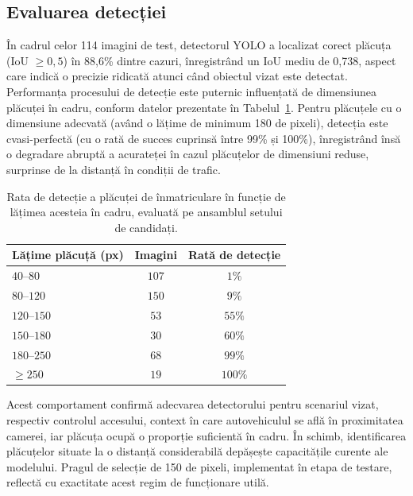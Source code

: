 \documentclass[../../main.tex]{subfiles}
\begin{document}
\subsection{Evaluarea detecției}
\label{subsec:placute_detectie}

În cadrul celor 114 imagini de test, detectorul YOLO a localizat corect plăcuța (IoU $\geq 0,5$) în 88,6\% dintre cazuri, înregistrând un IoU mediu de 0,738, aspect care indică o precizie ridicată atunci când obiectul vizat este detectat. Performanța procesului de detecție este puternic influențată de dimensiunea plăcuței în cadru, conform datelor prezentate în Tabelul~\ref{tab:placute_detectie}. Pentru plăcuțele cu o dimensiune adecvată (având o lățime de minimum 180 de pixeli), detecția este cvasi-perfectă (cu o rată de succes cuprinsă între 99\% și 100\%), înregistrând însă o degradare abruptă a acurateței în cazul plăcuțelor de dimensiuni reduse, surprinse de la distanță în condiții de trafic.

\begin{table}[h]
    \centering
    \caption{Rata de detecție a plăcuței de înmatriculare în funcție de lățimea acesteia în cadru, evaluată pe ansamblul setului de candidați.}
    \label{tab:placute_detectie}
    \begin{tabular}{l c c}
        \hline
        \textbf{Lățime plăcuță (px)} & \textbf{Imagini} & \textbf{Rată de detecție} \\
        \hline
        $40$--$80$    & $107$ & $1\%$   \\
        $80$--$120$   & $150$ & $9\%$   \\
        $120$--$150$  & $53$  & $55\%$  \\
        $150$--$180$  & $30$  & $60\%$  \\
        $180$--$250$  & $68$  & $99\%$  \\
        $\geq 250$    & $19$  & $100\%$ \\
        \hline
    \end{tabular}
\end{table}

Acest comportament confirmă adecvarea detectorului pentru scenariul vizat, respectiv controlul accesului, context în care autovehiculul se află în proximitatea camerei, iar plăcuța ocupă o proporție suficientă în cadru. În schimb, identificarea plăcuțelor situate la o distanță considerabilă depășește capacitățile curente ale modelului. Pragul de selecție de 150 de pixeli, implementat în etapa de testare, reflectă cu exactitate acest regim de funcționare utilă.
\end{document}
